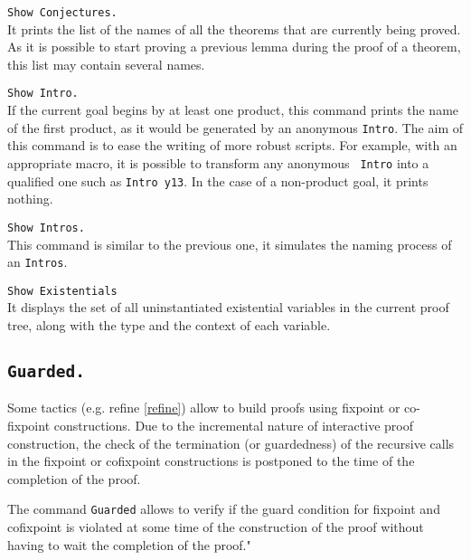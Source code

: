 \begin{Variants}
\item {\tt Show Conjectures.}\\
It prints the list of the names of all the theorems that 
are currently being proved.
As it is possible to start proving a previous lemma during
the proof of a theorem, this list may contain several 
names. 

\item{\tt Show Intro.}\\
If the current goal begins by at least one product, this command
prints the name of the first product, as it would be generated by 
an anonymous {\tt Intro}. The aim of this command is to ease the
writing of more robust scripts. For example, with an appropriate 
{\ProofGeneral} macro, it is possible to transform any anonymous {\tt
  Intro} into a qualified one such as {\tt Intro y13}.
In the case of a non-product goal, it prints nothing. 

\item{\tt Show Intros.}\\
This command is similar to the previous one, it simulates the naming 
process of an {\tt Intros}.

\item{\tt Show Existentials\label{ShowExistentials}}
\\ It displays
the set of all uninstantiated existential variables in the current proof tree, 
along with the type and the context of each variable.

\end{Variants}


\subsection[\tt Guarded.]{\tt Guarded.\label{Guarded}}

Some tactics (e.g. refine \ref{refine}) allow to build proofs using
fixpoint or co-fixpoint constructions. Due to the incremental nature
of interactive proof construction, the check of the termination (or
guardedness) of the recursive calls in the fixpoint or cofixpoint
constructions is postponed to the time of the completion of the proof.

The command \verb!Guarded! allows to verify if the guard condition for
fixpoint and cofixpoint is violated at some time of the construction
of the proof without having to wait the completion of the proof."


